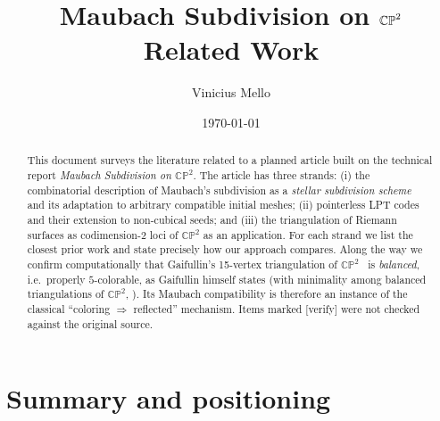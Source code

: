 \documentclass[11pt]{article}
\title{\bf Maubach Subdivision on $\CP^2$\\[4pt]\large Related Work}
\author{Vinicius Mello}
\date{\today}
\newcommand{\CP}{\mathbb{CP}}
\newcommand{\verify}{\textcolor{red!70!black}{\textsf{[verify]}}}
\begin{document}
\maketitle

\begin{abstract}
This document surveys the literature related to a planned article built on
the technical report \emph{Maubach Subdivision on $\CP^2$}. The article has
three strands: (i) the combinatorial description of Maubach's subdivision as
a \emph{stellar subdivision scheme}~\cite{mello2006} and its adaptation to
arbitrary compatible initial meshes; (ii) pointerless LPT
codes~\cite{atalaymount2007} and their extension to non-cubical seeds; and
(iii) the triangulation of Riemann surfaces as codimension-2 loci of $\CP^2$
as an application. For each strand we list the closest prior work and state
precisely how our approach compares. Along the way we confirm
computationally that Gaifullin's 15-vertex triangulation of
$\CP^2$~\cite{gaifullin2009} is \emph{balanced}, i.e.\ properly
$5$-colorable, as Gaifullin himself states (with minimality among balanced
triangulations of $\CP^2$, \cite[\S2]{gaifullin2009}). Its Maubach
compatibility is therefore an instance of the classical
``coloring $\Rightarrow$ reflected'' mechanism. Items marked \verify{} were not checked against the original source.
\end{abstract}

\tableofcontents

\section{Summary and positioning}
\end{document}
